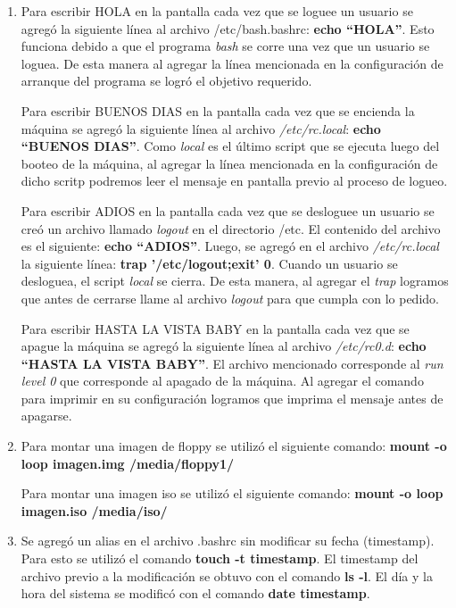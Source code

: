 \documentclass[a4paper,11pt] {article}
\begin{document}
\begin{enumerate}
	\item Para escribir HOLA en la pantalla cada vez que se loguee un usuario se agreg\'o la siguiente l\'inea al archivo 	/etc/bash.bashrc:	\textbf{echo ``HOLA''}. Esto funciona debido a que el programa \textit{bash} se corre una vez que un 	usuario se loguea. De esta manera al agregar la l\'inea mencionada en la configuraci\'on de arranque del programa se 	logr\'o el objetivo requerido.
	
	Para escribir BUENOS DIAS en la pantalla cada vez que se encienda la m\'aquina se agreg\'o la siguiente l\'inea al 	archivo \textit{/etc/rc.local}: \textbf{echo ``BUENOS DIAS''}. Como \textit{local} es el \'ultimo script que se ejecuta 	luego	del booteo de la m\'aquina, al agregar la l\'inea mencionada en la configuraci\'on de dicho scritp podremos 	leer el mensaje en pantalla previo al proceso de logueo.
	
	Para escribir ADIOS en la pantalla cada vez que se desloguee un usuario se cre\'o un archivo llamado \textit{logout} en el directorio /etc. El contenido del archivo es el siguiente: \textbf{echo ``ADIOS''}. Luego, se agreg\'o en el 	archivo \textit{/etc/rc.local} la siguiente l\'inea: \textbf{trap '/etc/logout;exit' 0}. Cuando un usuario se 	desloguea, el script \textit{local} se cierra. De esta manera, al agregar el \textit{trap} logramos que antes de 	cerrarse llame al archivo \textit{logout} para que cumpla con lo pedido.
	
	Para escribir HASTA LA VISTA BABY en la pantalla cada vez que se apague la m\'aquina se agreg\'o la siguiente l\'inea 	al archivo \textit{/etc/rc0.d}: \textbf{echo ``HASTA LA VISTA BABY''}. El archivo mencionado corresponde al \textit{run 	level 0} que corresponde al apagado de la m\'aquina. Al agregar el comando para imprimir en su configuraci\'on 	logramos que imprima el mensaje antes de apagarse.
	
	\item Para montar una imagen de floppy se utiliz\'o el siguiente comando:
		\textbf{mount -o loop imagen.img /media/floppy1/}
		
		Para montar una imagen iso se utiliz\'o el siguiente comando:
		\textbf{mount -o loop imagen.iso /media/iso/}
		
	\item Se agreg\'o un alias en el archivo .bashrc sin modificar su fecha (timestamp). Para esto se utiliz\'o el comando \textbf{touch -t timestamp}. El timestamp del archivo previo a la modificaci\'on se obtuvo con el comando  \textbf{ls -l}.
	El d\'ia y la hora del sistema se modific\'o con el comando \textbf{date timestamp}.
	

\end{enumerate}
\end{document}
